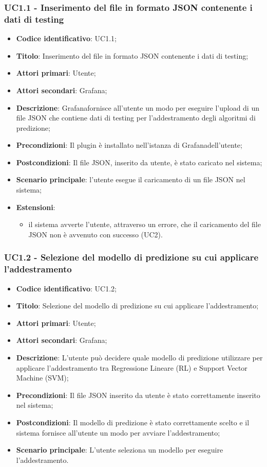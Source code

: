 \subsubsection{UC1.1 - Inserimento del file in formato JSON contenente i dati di testing}
\begin{itemize}
	\item \textbf{Codice identificativo}: UC1.1;
	\item \textbf{Titolo}: Inserimento del file in formato JSON contenente i dati di testing;
	\item \textbf{Attori primari}: Utente;
	\item \textbf{Attori secondari}: Grafana\glo;
	\item \textbf{Descrizione}: Grafana\glosp fornisce all'utente un modo per eseguire l'upload di un file JSON che contiene dati di testing per l'addestramento degli algoritmi di predizione;
	\item \textbf{Precondizioni}: Il plugin è installato nell'istanza di Grafana\glosp dell'utente;
	\item \textbf{Postcondizioni}: Il file JSON, inserito da utente, è stato caricato nel sistema;
	\item \textbf{Scenario principale}: l'utente esegue il caricamento di un file JSON nel sistema;
	\item \textbf{Estensioni}:
		\begin{itemize}
			\item il sistema avverte l'utente, attraverso un errore, che il caricamento del file JSON non è avvenuto con successo (UC2).
		\end{itemize}
\end{itemize}

\subsubsection{UC1.2 - Selezione del modello di predizione su cui applicare l'addestramento}
\begin{itemize}
	\item \textbf{Codice identificativo}: UC1.2;
	\item \textbf{Titolo}: Selezione del modello di predizione su cui applicare l'addestramento;
	\item \textbf{Attori primari}: Utente;
	\item \textbf{Attori secondari}: Grafana\glo;
	\item \textbf{Descrizione}: L'utente può decidere quale modello di predizione utilizzare per applicare l'addestramento tra Regressione Lineare (RL\glo) e Support Vector Machine (SVM\glo);
	\item \textbf{Precondizioni}: Il file JSON inserito da utente è stato correttamente inserito nel sistema;
	\item \textbf{Postcondizioni}: Il modello di predizione è stato correttamente scelto e il sistema fornisce all'utente un modo per avviare l'addestramento;
	\item \textbf{Scenario principale}: L'utente seleziona un modello per eseguire l'addestramento.
\end{itemize}

